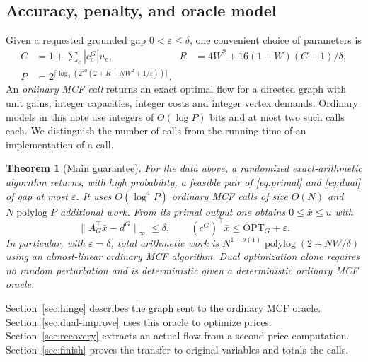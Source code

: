 \documentclass[11pt,letterpaper]{article}
\newtheorem{theorem}{Theorem}[section]
\begin{document}
\subsection{Accuracy, penalty, and oracle model}
Given a requested grounded gap $0<\varepsilon\le\delta$, one convenient
choice of parameters is
\begin{align}
 C&=1+\sum_e |c^G_e|u_e, &
 R&=4W^2+16(1+W)(C+1)/\delta,\label{eq:R}\\
 P&=2^{\lceil\log_2(2^{20}(2+R+NW^2+1/\varepsilon))\rceil}.\nonumber
\end{align}
An \emph{ordinary MCF call} returns an exact optimal flow for a directed graph
with unit gains, integer capacities, integer costs and integer vertex demands.
Ordinary models in this note use integers of $O(\log P)$ bits and at most
two such calls each. We distinguish the number of calls from the running
time of an implementation of a call.
\begin{theorem}[Main guarantee]\label{thm:main}
For the data above, a randomized exact-arithmetic algorithm returns, with
high probability, a feasible pair of \eqref{eq:primal} and \eqref{eq:dual}
of gap at most $\varepsilon$. It uses $O(\log^4 P)$ ordinary MCF calls
of size $O(N)$ and $N\operatorname{polylog} P$ additional work. From its
primal output one obtains $0\le\bar x\le u$ with
\[
 \|A_G^\top\bar x-d^G\|_\infty\le\delta,\qquad
 (c^G)^\top\bar x\le\mathrm{OPT}_G+\varepsilon .
\]
In particular, with $\varepsilon=\delta$, total arithmetic work is
$N^{1+o(1)}\operatorname{polylog}(2+NW/\delta)$ using an almost-linear
ordinary MCF algorithm. Dual optimization alone requires no random
perturbation and is deterministic given a deterministic ordinary MCF oracle.
\end{theorem}

Section~\ref{sec:hinge} describes the graph
sent to the ordinary MCF oracle. Section~\ref{sec:dual-improve} uses this
oracle to optimize prices. Section~\ref{sec:recovery} extracts an actual flow
from a second price computation. Section~\ref{sec:finish} proves the transfer
to original variables and totals the calls.
\end{document}
